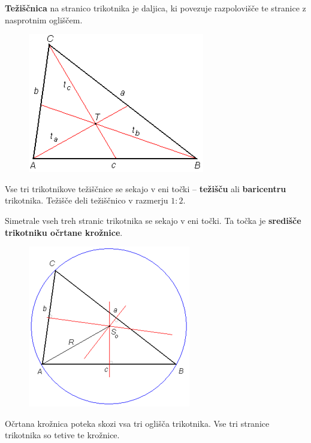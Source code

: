        \begin{frame}

            \begin{alertblock}{}
                \textbf{Težiščnica} na stranico trikotnika je daljica, ki povezuje razpolovišče te stranice z nasprotnim ogliščem. 
            \end{alertblock}

            \begin{figure}
                \includegraphics[scale=0.5]{Slike in skice/Teziscnice_in_tezisce.png}
            \end{figure}

            \begin{alertblock}{}
                Vse tri trikotnikove težiščnice se sekajo v eni točki -- \textbf{težišču} ali \textbf{baricentru} trikotnika. 
                Težišče deli težiščnico v razmerju $1:2$.
            \end{alertblock}

        \end{frame}


        \begin{frame}

            \begin{alertblock}{}
                Simetrale vseh treh stranic trikotnika se sekajo v eni točki. Ta točka je \textbf{središče trikotniku očrtane krožnice}. 
            \end{alertblock}

            \begin{figure}
                \includegraphics[scale=0.55]{Slike in skice/Trikotniku_ocrtana_kroznica.png}
            \end{figure}

            Očrtana krožnica poteka skozi vsa tri oglišča trikotnika. Vse tri stranice trikotnika so tetive te krožnice.

        \end{frame}


